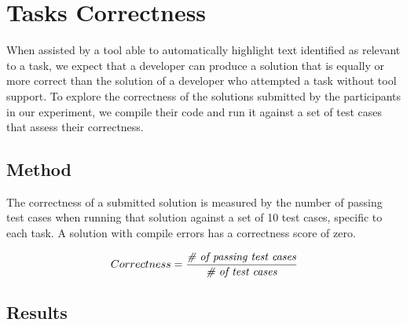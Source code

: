 
\section{Tasks Correctness}
\label{cp6:correctness}



When assisted by a tool able to automatically highlight text identified as relevant to a task, we expect that a developer can produce a solution 
that is equally or more correct than the solution of a developer who attempted a task without tool support. 
To explore the correctness of the solutions submitted by the participants in our experiment, we compile their code and run it against a set of test cases 
that assess their correctness.


\subsection{Method}


The correctness of a submitted solution is measured by the number of passing test cases
when running that solution against a set of 10 test cases, specific to each task. 
A solution with compile errors has a correctness score of zero.


\smallskip
\begin{small}


\begin{equation}
    Correctness = \frac{ \text{\textit{\# of passing test cases}}}{\text{\textit{\#  of test cases}}}
\end{equation}
\end{small}

\subsection{Results}
 
